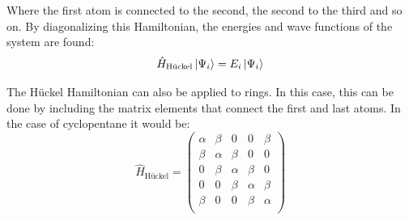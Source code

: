 \documentclass[twocolumn]{article}
\begin{document}
Where the first atom is connected to the second, the second to the third and so on. By diagonalizing this Hamiltonian, the energies and wave functions of the system are found:
\begin{equation}
    \hat{H}_{\textrm{Hückel}}\ket{\Psi_i}   =  E_{i}\ket{\Psi_i}
\end{equation}

The Hückel Hamiltonian can also be applied to rings. In this case, this can be done by including the matrix elements that connect the first and last atoms. In the case of cyclopentane it would be: 
\begin{equation}
    \hat{H}_{\textrm{Hückel}}  =
    \begin{pmatrix}
        \alpha & \beta & 0 & 0 & \beta \\
        \beta & \alpha & \beta & 0 & 0 \\
        0 & \beta & \alpha & \beta & 0 \\
        0 & 0 & \beta & \alpha & \beta \\
        \beta & 0 & 0 & \beta & \alpha \\
    \end{pmatrix}
\end{equation}
\end{document}
